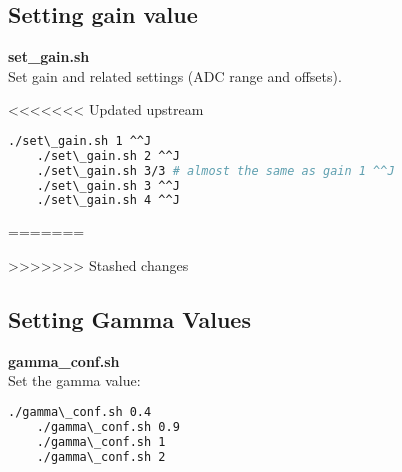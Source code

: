 \subsection{Setting gain value}

\textbf{set\_gain.sh}\\

Set gain and related settings (ADC range and offsets). 

<<<<<<< Updated upstream
\begin{lstlisting}[language=bash,morekeywords=$,keywordstyle=\bfseries,frame=none,xleftmargin=.25in,belowskip=2em]
    ./set\_gain.sh 1 ^^J
    ./set\_gain.sh 2 ^^J
    ./set\_gain.sh 3/3 # almost the same as gain 1 ^^J
    ./set\_gain.sh 3 ^^J
    ./set\_gain.sh 4 ^^J
\end{lstlisting}
=======


>>>>>>> Stashed changes

\subsection{Setting Gamma Values}

\textbf{gamma\_conf.sh}\\

Set the gamma value: 

\begin{lstlisting}[language=bash,morekeywords=$,keywordstyle=\bfseries,frame=none,xleftmargin=.25in,belowskip=2em]
    ./gamma\_conf.sh 0.4
    ./gamma\_conf.sh 0.9
    ./gamma\_conf.sh 1
    ./gamma\_conf.sh 2
\end{lstlisting}
